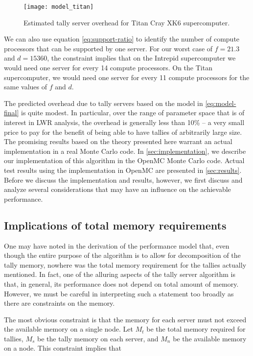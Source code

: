 \documentclass[3p]{elsarticle}
\begin{document}
\begin{figure}[htb]
  \centering
  \texttt{[image: model\_titan]}
  \caption{Estimated tally server overhead for Titan Cray XK6 supercomputer.}
  \label{fig:model-titan}
\end{figure}

We can also use equation \eqref{eq:support-ratio} to identify the number of
compute processors that can be supported by one server. For our worst case of $f
= 21.3$ and $d = 15360$, the constraint implies that on the Intrepid
supercomputer we would need one server for every 14 compute processors. On the
Titan supercomputer, we would need one server for every 11 compute processors
for the same values of $f$ and $d$.

The predicted overhead due to tally servers based on the model in
\eqref{eq:model-final} is quite modest. In particular, over the range of
parameter space that is of interest in LWR analysis, the overhead is generally
less than 10\% -- a very small price to pay for the benefit of being able to
have tallies of arbitrarily large size. The promising results based on the
theory presented here warrant an actual implementation in a real Monte Carlo
code. In \autoref{sec:implementation}, we describe our implementation of this
algorithm in the OpenMC Monte Carlo code. Actual test results using the
implementation in OpenMC are presented in \autoref{sec:results}. Before we
discuss the implementation and results, however, we first discuss and analyze
several considerations that may have an influence on the achievable performance.

\subsection{Implications of total memory requirements}

One may have noted in the derivation of the performance model that, even though
the entire purpose of the algorithm is to allow for decomposition of the tally
memory, nowhere was the total memory requirement for the tallies actually
mentioned. In fact, one of the alluring aspects of the tally server algorithm is
that, in general, its performance does not depend on total amount of
memory. However, we must be careful in interpreting such a statement too broadly
as there are constraints on the memory.

The most obvious constraint is that the memory for each server must not exceed
the available memory on a single node. Let $M_t$ be the total memory required for
tallies, $M_s$ be the tally memory on each server, and $M_n$ be the available
memory on a node. This constraint implies that
\end{document}
